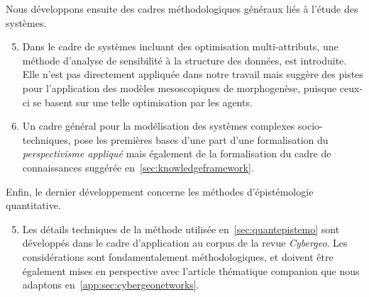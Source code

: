 Nous développons ensuite des cadres méthodologiques généraux liés à l'étude des systèmes.

\begin{enumerate}\setcounter{enumi}{4}
	\item Dans le cadre de systèmes incluant des optimisation multi-attributs, une méthode d'analyse de sensibilité à la structure des données, est introduite. Elle n'est pas directement appliquée dans notre travail mais suggère des pistes pour l'application des modèles mesoscopiques de morphogenèse, puisque ceux-ci se basent sur une telle optimisation par les agents.
	\item Un cadre général pour la modélisation des systèmes complexes socio-techniques, pose les premières bases d'une part d'une formalisation du \emph{perspectivisme appliqué} mais également de la formalisation du cadre de connaissances suggérée en~\ref{sec:knowledgeframework}.
\end{enumerate}

Enfin, le dernier développement concerne les méthodes d'épistémologie quantitative.

\begin{enumerate}\setcounter{enumi}{4}
	\item Les détails techniques de la méthode utilisée en~\ref{sec:quantepistemo} sont développés dans le cadre d'application au corpus de la revue \emph{Cybergeo}. Les considérations sont fondamentalement méthodologiques, et doivent être également mises en perspective avec l'article thématique companion que nous adaptons en~\ref{app:sec:cybergeonetworks}.
\end{enumerate}




